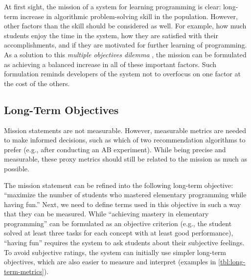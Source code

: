 At first sight, the mission of a system for learning programming is clear:
  long-term increase in algorithmic problem-solving skill in the population.
However, other factors than the skill should be considered as well.
For example, how much students enjoy the time in the system,
  how they are satisfied with their accomplishments,
  and if they are motivated for further learning of programming.
As a solution to this \emph{multiple objectives dilemma} \cite[][Rule 39]{google-ml-rules},
  the mission can be formulated as achieving a balanced increase in all
  of these important factors.
Such formulation reminds developers of the system not to overfocus on one factor
  at the cost of the others.


\subsection{Long-Term Objectives}
\label{sec:long-term-objectives}


Mission statements are not measurable.
However, measurable metrics are needed to make informed decisions,
such as which of two recommendation algorithms to prefer
(e.g., after conducting an AB experiment). %
While being precise and measurable, these proxy metrics
should still be related to the mission as much as possible.

The mission statement can be refined into the following
  long-term objective: ``maximize the number of students
  who mastered elementary programming while having fun.''  %
Next, we need to define terms used in this objective in such a way that they can be measured.
While ``achieving mastery in elementary programming'' can be
  formulated as an objective criterion
  (e.g., the student solved at least three tasks for each concept with at least good performance),
  ``having fun'' requires the system to ask students about their subjective feelings.
To avoid subjective ratings, the system can initially use simpler long-term objectives,
which are also easier to measure and interpret
(examples in \cref{tbl:long-term-metrics}).

